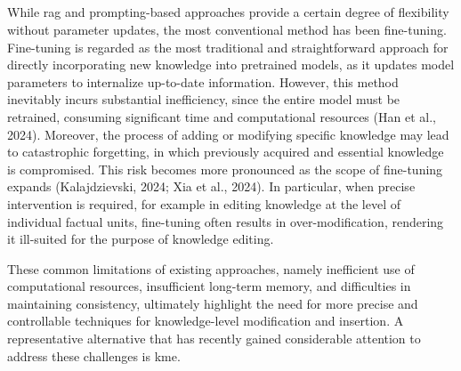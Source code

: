 \documentclass[a4paper,fleqn]{cas-sc}
\begin{document}
\subsection{}
While \gls{rag} and prompting-based approaches provide a certain degree of flexibility without parameter updates, the most conventional method has been fine-tuning. Fine-tuning is regarded as the most traditional and straightforward approach for directly incorporating new knowledge into pretrained models, as it updates model parameters to internalize up-to-date information. However, this method inevitably incurs substantial inefficiency, since the entire model must be retrained, consuming significant time and computational resources (Han et al., 2024). Moreover, the process of adding or modifying specific knowledge may lead to catastrophic forgetting, in which previously acquired and essential knowledge is compromised. This risk becomes more pronounced as the scope of fine-tuning expands (Kalajdzievski, 2024; Xia et al., 2024). In particular, when precise intervention is required, for example in editing knowledge at the level of individual factual units, fine-tuning often results in over-modification, rendering it ill-suited for the purpose of knowledge editing.

These common limitations of existing approaches, namely inefficient use of computational resources, insufficient long-term memory, and difficulties in maintaining consistency, ultimately highlight the need for more precise and controllable techniques for knowledge-level modification and insertion. A representative alternative that has recently gained considerable attention to address these challenges is \gls{kme}.
\end{document}
